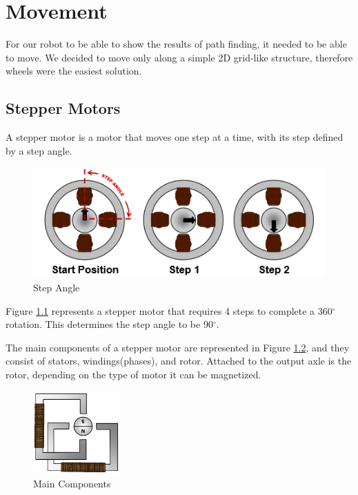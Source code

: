 \chapter{Movement}\label{ch:move}
For our robot to be able to show the results of path finding,
it needed to be able to move. We decided to move only along a simple 2D grid-like structure,
therefore wheels were the easiest solution.



\section{Stepper Motors}\label{sec:motors}
A stepper motor is a motor that moves one step at a time, with its step defined by a step angle.

\begin{figure}[ht]
	\centering
	\includegraphics[width=\textwidth]{figures/move/motor1.png}
	\caption{Step Angle}
	\label{fig:angle} 
\end{figure}

Figure \ref{fig:angle} represents a stepper motor that requires 4 steps to complete a 360$^\circ$ 
rotation. This determines the step angle to be 90$^\circ$.

The main components of a stepper motor are represented in Figure \ref{fig:main_components}, and 
they consist of stators, windings(phases), and rotor.
Attached to the output axle is the rotor, depending on the type of motor it can be magnetized.
\newpage
\begin{figure}[htp]
	\centering
	\includegraphics[width=0.3\textwidth]{figures/move/motor2.png}
	\caption{Main Components}
	\label{fig:main_components}
\end{figure}


